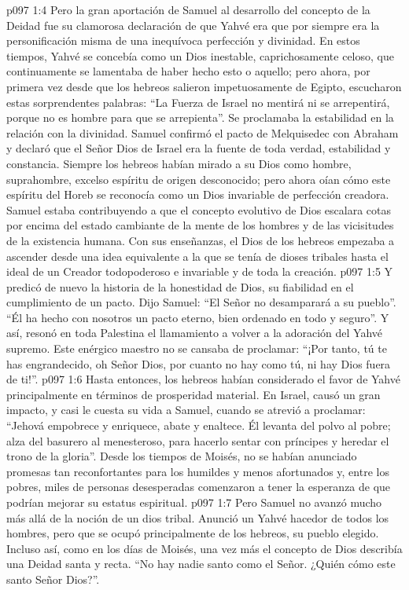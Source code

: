\vs p097 1:4 Pero la gran aportación de Samuel al desarrollo del concepto de la Deidad fue su clamorosa declaración de que Yahvé era  que por siempre era la personificación misma de una inequívoca perfección y divinidad. En estos tiempos, Yahvé se concebía como un Dios inestable, caprichosamente celoso, que continuamente se lamentaba de haber hecho esto o aquello; pero ahora, por primera vez desde que los hebreos salieron impetuosamente de Egipto, escucharon estas sorprendentes palabras: “La Fuerza de Israel no mentirá ni se arrepentirá, porque no es hombre para que se arrepienta”. Se proclamaba la estabilidad en la relación con la divinidad. Samuel confirmó el pacto de Melquisedec con Abraham y declaró que el Señor Dios de Israel era la fuente de toda verdad, estabilidad y constancia. Siempre los hebreos habían mirado a su Dios como hombre, suprahombre, excelso espíritu de origen desconocido; pero ahora oían cómo este espíritu del Horeb se reconocía como un Dios invariable de perfección creadora. Samuel estaba contribuyendo a que el concepto evolutivo de Dios escalara cotas por encima del estado cambiante de la mente de los hombres y de las vicisitudes de la existencia humana. Con sus enseñanzas, el Dios de los hebreos empezaba a ascender desde una idea equivalente a la que se tenía de dioses tribales hasta el ideal de un Creador todopoderoso e invariable y  de toda la creación.
\vs p097 1:5 Y predicó de nuevo la historia de la honestidad de Dios, su fiabilidad en el cumplimiento de un pacto. Dijo Samuel: “El Señor no desamparará a su pueblo”. “Él ha hecho con nosotros un pacto eterno, bien ordenado en todo y seguro”. Y así, resonó en toda Palestina el llamamiento a volver a la adoración del Yahvé supremo. Este enérgico maestro no se cansaba de proclamar: “¡Por tanto, tú te has engrandecido, oh Señor Dios, por cuanto no hay como tú, ni hay Dios fuera de ti!”.
\vs p097 1:6 \pc Hasta entonces, los hebreos habían considerado el favor de Yahvé principalmente en términos de prosperidad material. En Israel, causó un gran impacto, y casi le cuesta su vida a Samuel, cuando se atrevió a proclamar: “Jehová empobrece y enriquece, abate y enaltece. Él levanta del polvo al pobre; alza del basurero al menesteroso, para hacerlo sentar con príncipes y heredar el trono de la gloria”. Desde los tiempos de Moisés, no se habían anunciado promesas tan reconfortantes para los humildes y menos afortunados y, entre los pobres, miles de personas desesperadas comenzaron a tener la esperanza de que podrían mejorar su estatus espiritual.
\vs p097 1:7 Pero Samuel no avanzó mucho más allá de la noción de un dios tribal. Anunció un Yahvé hacedor de todos los hombres, pero que se ocupó principalmente de los hebreos, su pueblo elegido. Incluso así, como en los días de Moisés, una vez más el concepto de Dios describía una Deidad santa y recta. “No hay nadie santo como el Señor. ¿Quién cómo este santo Señor Dios?”.
